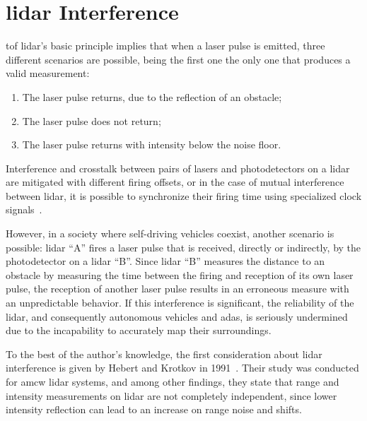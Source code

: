 \section{\ac{lidar} Interference}
\label{sec:sota:lidar-interference}
\ac{tof} \ac{lidar}'s basic principle implies that when a \ac{laser} pulse is emitted, three different scenarios are possible, being the first one the only one that produces a valid measurement:

\begin{enumerate}
\item The \ac{laser} pulse returns, due to the reflection of an obstacle;
\item The \ac{laser} pulse does not return;
\item The \ac{laser} pulse returns with intensity below the noise floor.
\end{enumerate}

Interference and crosstalk between pairs of \acp{laser} and photodetectors on a \ac{lidar} are mitigated with different firing offsets, or in the case of mutual interference between \ac{lidar}, it is possible to synchronize their firing time using specialized clock signals~\cite{vlp16}.

However, in a society where self-driving vehicles coexist, another scenario is possible: \ac{lidar} ``A'' fires a \ac{laser} pulse that is received, directly or indirectly, by the photodetector on a \ac{lidar} ``B''. Since \ac{lidar} ``B'' measures the distance to an obstacle by measuring the time between the firing and reception of its own \ac{laser} pulse, the reception of another \ac{laser} pulse results in an erroneous measure with an unpredictable behavior. If this interference is significant, the reliability of the \ac{lidar}, and consequently autonomous vehicles and \ac{adas}, is seriously undermined due to the incapability to accurately map their surroundings.



To the best of the author's knowledge, the first consideration about \ac{lidar} interference is given by Hebert and Krotkov in 1991~\cite{Hebert}. Their study was conducted for \ac{amcw} \ac{lidar} systems, and among other findings, they state that range and intensity measurements on \ac{lidar} are not completely independent, since lower intensity reflection can lead to an increase on range noise and shifts. 

